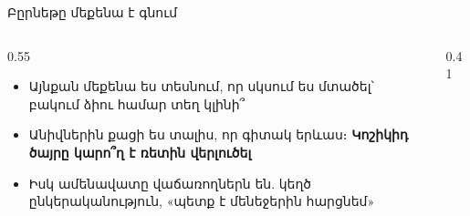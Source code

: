 
\begin{frame}{Բըրնեթը մեքենա է գնում}
  \begin{columns}[c]
    \begin{column}{0.55\textwidth}
      \begin{itemize}
        \item Այնքան մեքենա ես տեսնում, որ սկսում ես մտածել՝ բակում ձիու համար տեղ կլինի՞
        \item Անիվներին քացի ես տալիս, որ գիտակ երևաս։ \textbf{Կոշիկիդ ծայրը կարո՞ղ է ռետին վերլուծել}
        \item<2-> Իսկ ամենավատը վաճառողներն են. կեղծ ընկերականություն, «պետք է մենեջերին հարցնեմ»
      \end{itemize}
    \end{column}
    \begin{column}{0.41\textwidth}
      \centering
      \ \par\medskip
    \end{column}
  \end{columns}
\end{frame}

